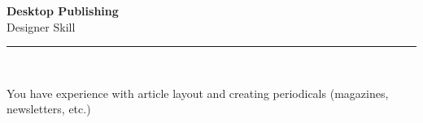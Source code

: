 \documentclass[11pt,a4paper]{memoir}
\begin{document}
    \begin{Spacing}{0.75}%
        \noindent
        \Large
        \textbf{Desktop Publishing}\\[3pt]
        \scriptsize\color{gray}Designer Skill\\ 
        \rule{\textwidth}{.3mm}\\
        
        \vspace{3mm}
        \noindent
        \begin{minipage}[t]{53mm}
            \begin{flushleft}
            {
                \normalsize
                \begin{Spacing}{1}%
                \color{black}\textrm{You have experience with article layout and creating periodicals (magazines, newsletters, etc.)}\\
                \end{Spacing}
            }
            \end{flushleft}
        \end{minipage}

        \vspace{5mm}
        \noindent
        \begin{minipage}[t]{53mm}
            \begin{flushleft}
            {
                \normalsize
                \begin{Spacing}{1}%
                \color{gray}\textit{}\\
                \end{Spacing}
            }
            \end{flushleft}
        \end{minipage}
    \end{Spacing}
    \clearpage
\end{document}
